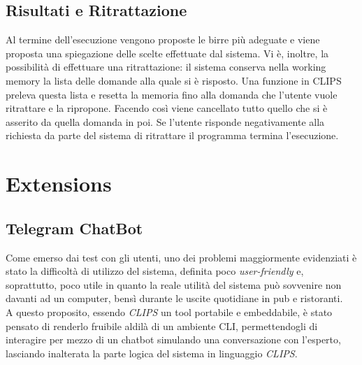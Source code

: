 \documentclass[12pt]{article}
\begin{document}
\subsection{Risultati e Ritrattazione}

Al termine dell'esecuzione vengono proposte le birre più adeguate e viene proposta una spiegazione delle scelte effettuate dal sistema. Vi è, inoltre, la possibilità di effettuare una ritrattazione: il sistema conserva nella working memory la lista delle domande alla quale si è risposto. Una funzione in CLIPS preleva questa lista e resetta la memoria fino alla domanda che l’utente vuole ritrattare e la ripropone. Facendo così viene cancellato tutto quello che si è asserito da quella domanda in poi. Se l’utente risponde negativamente alla richiesta da parte del sistema di ritrattare il programma termina l’esecuzione.

\newpage
\section{Extensions}

\subsection{Telegram ChatBot}
Come emerso dai test con gli utenti, uno dei problemi maggiormente evidenziati è stato la difficoltà di utilizzo del sistema, definita poco \textit{user-friendly} e, soprattutto, poco utile in quanto la reale utilità del sistema può sovvenire non davanti ad un computer, bensì durante le uscite quotidiane in pub e ristoranti.\\A questo proposito, essendo \textit{CLIPS} un tool portabile e embeddabile, è stato pensato di renderlo fruibile aldilà di un ambiente CLI, permettendogli di interagire per mezzo di un chatbot simulando una conversazione con l'esperto, lasciando inalterata la parte logica del sistema in linguaggio \textit{CLIPS}.
\end{document}

